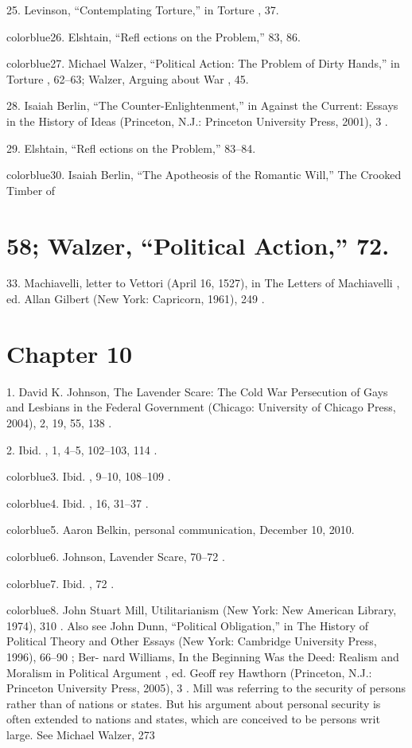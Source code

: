 	{\color{blue}25}. Levinson, “Contemplating Torture,” in Torture , 37.


	{color{blue}26}. Elshtain, “Refl ections on the Problem,” 83, 86.


	{color{blue}27}. Michael Walzer, “Political Action: The Problem of Dirty Hands,” in Torture , 62–63; Walzer, Arguing about War , 45.


	{\color{blue}28}. Isaiah Berlin, “The Counter-Enlightenment,” in Against the Current: Essays in the History of Ideas (Princeton, N.J.: Princeton University Press, 2001), 3 .


	{\color{blue}29}. Elshtain, “Refl ections on the Problem,” 83–84.


	{color{blue}30}. Isaiah Berlin, “The Apotheosis of the Romantic Will,” The Crooked Timber of


\section{58; Walzer, “Political Action,” 72.}


	{\color{blue}33}. Machiavelli, letter to Vettori (April 16, 1527), in The Letters of Machiavelli , ed. Allan Gilbert (New York: Capricorn, 1961), 249 .


\section{Chapter 10}


	{\color{blue}1}. David K. Johnson, The Lavender Scare: The Cold War Persecution of Gays and Lesbians in the Federal Government (Chicago: University of Chicago Press, 2004), 2, 19, 55, 138 .


	{\color{blue}2}. Ibid. , 1, 4–5, 102–103, 114 .


	{color{blue}3}. Ibid. , 9–10, 108–109 .


	{color{blue}4}. Ibid. , 16, 31–37 .


	{color{blue}5}. Aaron Belkin, personal communication, December 10, 2010.


	{color{blue}6}. Johnson, Lavender Scare, 70–72 .


	{color{blue}7}. Ibid. , 72 .


	{color{blue}8}. John Stuart Mill, Utilitarianism (New York: New American Library, 1974), 310 . Also see John Dunn, “Political Obligation,” in The History of Political Theory and Other Essays (New York: Cambridge University Press, 1996), 66–90 ; Ber- nard Williams, In the Beginning Was the Deed: Realism and Moralism in Political Argument , ed. Geoff rey Hawthorn (Princeton, N.J.: Princeton University Press, 2005), 3 . Mill was referring to the security of persons rather than of nations or states. But his argument about personal security is often extended to nations and states, which are conceived to be persons writ large. See Michael Walzer, 273


